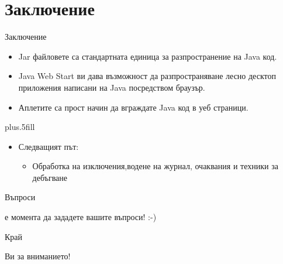 \documentclass{beamer}
\begin{document}
\section*{Заключение}

\begin{frame}{Заключение}
  \transdissolve
  \begin{itemize}
  \item
    Jar файловете са стандартната единица за разпространение на Java код.
  \item
    Java Web Start ви дава възможност да разпространяване лесно
    десктоп приложения написани на Java посредством браузър.
  \item
    Аплетите са прост начин да вграждате Java код в уеб страници.
  \end{itemize}
  
  \vskip0pt plus.5fill
  \begin{itemize}
  \item
    Следващият път:
    \begin{itemize}
    \item
      Обработка на изключения,водене на журнал, очаквания и техники за дебъгване
    \end{itemize}
  \end{itemize}
\end{frame}

\begin{frame}{Въпроси}
  \transdissolve
  \begin{center}
     е момента да зададете вашите въпроси! :-)
  \end{center}
\end{frame}

\begin{frame}{Край}
  \transdissolve
  \begin{center}
     Ви за вниманието!
  \end{center}
\end{frame}
\end{document}
